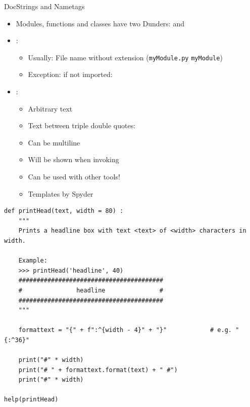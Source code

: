 \begin{frame}[fragile]{DocStrings and Nametags}
%
\begin{itemize}
\item Modules, functions and classes have two Dunders:  and 
\item {}:
	\begin{itemize}
	\item Usually: File name without extension (\texttt{myModule.py} \thus \texttt{myModule})
	\item Exception: if not imported: 
	\end{itemize}
\item {}:
	\begin{itemize}
	\item Arbitrary text
	\item Text between triple double quotes: 
	\item Can be multiline
	\item Will be shown when invoking 
	\item Can be used with other tools!
	\item Templates by Spyder
	\end{itemize}
\end{itemize}
%
\end{frame}


\begin{frame}[fragile]
%
\begin{codebox}
\begin{verbatim}
def printHead(text, width = 80) :
    """
    Prints a headline box with text <text> of <width> characters in width.
    
    Example:
    >>> printHead('headline', 40)
    ########################################
    #               headline               #
    ########################################
    """
    
    formattext = "{" + f":^{width - 4}" + "}"            # e.g. "{:^36}"
    
    print("#" * width)
    print("# " + formattext.format(text) + " #")
    print("#" * width)

help(printHead)
\end{verbatim}
\end{codebox}
%
\end{frame}

